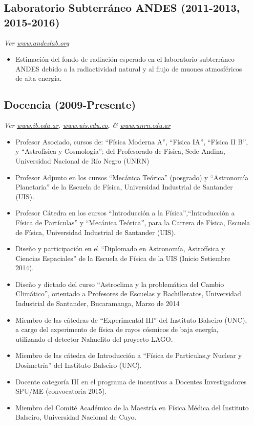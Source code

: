 \subsection*{Laboratorio Subterráneo ANDES (2011-2013, 2015-2016)}
{\small{\textit{Ver \href{http://www.andeslab.org}{www.andeslab.org}}}}
\begin{itemize}
\item Estimación del fondo de radiación esperado en el laboratorio subterráneo ANDES debido a la radiactividad natural y al flujo de muones atmosféricos de alta energía.
\end{itemize}

\subsection*{Docencia (2009-Presente)}
{\small{\textit{Ver \href{http://www.ib.edu.ar}{www.ib.edu.ar}, \href{http://www.uis.edu.co}{www.uis.edu.co}, \& \href{http://www.unrn.edu.ar}{www.unrn.edu.ar}}}}
\begin{itemize}
	\item Profesor Asociado, cursos de: ``Física Moderna A'', ``Física IA'', ``Física II B'', y ``Astrofísica y Cosmología''; del Profesorado de Física, Sede Andina, Universidad Nacional de Río Negro (UNRN)
\item Profesor Adjunto en los cursos ``Mecánica Teórica'' (posgrado) y ``Astronomía Planetaria'' de la Escuela de Física, Universidad Industrial de Santander (UIS).
\item Profesor Cátedra en los cursos ``Introducción a la Física'',``Introducción a Física de Partículas'' y ``Mecánica Teórica'', para la Carrera de Física, Escuela de Física, Universidad Industrial de Santander (UIS).
\item Diseño y participación en el ``Diplomado en Astronomía, Astrofísica y Ciencias Espaciales'' de la Escuela de Física de la UIS (Inicio Setiembre 2014).
\item Diseño y dictado del curso ``Astroclima y la problemática del Cambio Climático'', orientado a Profesores de Escuelas y Bachilleratos, Universidad Industrial de Santander, Bucaramanga, Marzo de 2014
\item Miembro de las cátedras de ``Experimental III'' del Instituto Balseiro (UNC), a cargo del experimento de física de rayos cósmicos de baja energía, utilizando el detector Nahuelito del proyecto LAGO.
\item Miembro de las cátedra de Introducción a ``Física de Partículas,y Nuclear y Dosimetría'' del Instituto Balseiro (UNC).
\item Docente categoría III en el programa de incentivos a Docentes Investigadores SPU/ME (convocatoria 2015).
\item Miembro del Comité Académico de la Maestría en Física Médica del Instituto Balseiro, Universidad Nacional de Cuyo.
\end{itemize}
\fi
